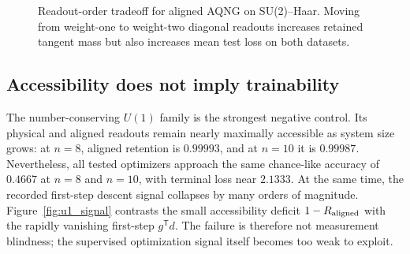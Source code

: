 \begin{figure}[t]
\centering
{}
\caption{Readout-order tradeoff for aligned AQNG on SU(2)--Haar. Moving from weight-one to weight-two diagonal readouts increases retained tangent mass but also increases mean test loss on both datasets.}
\label{fig:readout_order_tradeoff}
\end{figure}

\subsection{Accessibility does not imply trainability}
The number-conserving $U(1)$ family is the strongest negative control. Its physical and aligned readouts remain nearly maximally accessible as system size grows: at $n=8$, aligned retention is $0.99993$, and at $n=10$ it is $0.99987$. Nevertheless, all tested optimizers approach the same chance-like accuracy of $0.4667$ at $n=8$ and $n=10$, with terminal loss near $2.1333$. At the same time, the recorded first-step descent signal collapses by many orders of magnitude. Figure~\ref{fig:u1_signal} contrasts the small accessibility deficit $1-R_{\rm aligned}$ with the rapidly vanishing first-step $g^{\mathsf T}d$. The failure is therefore not measurement blindness; the supervised optimization signal itself becomes too weak to exploit.

